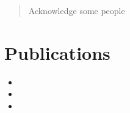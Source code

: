 \documentclass[a4paper, twoside, openright, 11pt, oldfontcommands]{memoir}
\begin{document}
\newpage

\renewcommand{\abstractname}{Acknowledgements}
\begin{abstract}
Acknowledge some people
\end{abstract}

\chapter{Publications}
\begin{itemize}
    \item {}
    \item {}
    \item {}
\end{itemize}

\clearpage

\setcounter{secnumdepth}{3}
\setcounter{tocdepth}{3}
\tableofcontents

\newpage

\mainmatter

















\backmatter
\cleardoublepage
\listoffigures
\cleardoublepage


\end{document}
